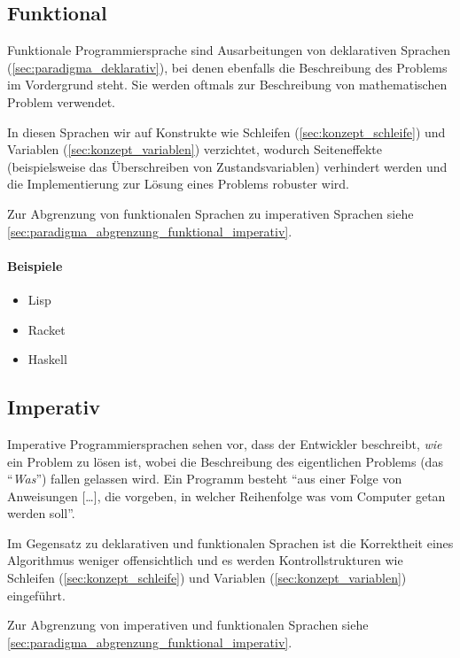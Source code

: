 	\subsection{Funktional}
		\label{sec:paradigma_funktional}
	
		Funktionale Programmiersprache sind Ausarbeitungen von deklarativen Sprachen (\ref{sec:paradigma_deklarativ}), bei denen ebenfalls die Beschreibung des Problems im Vordergrund steht. Sie werden oftmals zur Beschreibung von mathematischen Problem verwendet.
		
		In diesen Sprachen wir auf Konstrukte wie Schleifen (\ref{sec:konzept_schleife}) und Variablen (\ref{sec:konzept_variablen}) verzichtet, wodurch Seiteneffekte (beispielsweise das Überschreiben von Zustandsvariablen) verhindert werden und die Implementierung zur Lösung eines Problems robuster wird.
		
		Zur Abgrenzung von funktionalen Sprachen zu imperativen Sprachen siehe \ref{sec:paradigma_abgrenzung_funktional_imperativ}.
		
		\paragraph{Beispiele}
			\begin{itemize}
				\item Lisp
				\item Racket
				\item Haskell
			\end{itemize}
	
	\subsection{Imperativ}
		\label{sec:paradigma_imperativ}
	
		Imperative Programmiersprachen sehen vor, dass der Entwickler beschreibt, \textit{wie} ein Problem zu lösen ist, wobei die Beschreibung des eigentlichen Problems (das \enquote{\textit{Was}}) fallen gelassen wird. Ein Programm besteht \enquote{aus einer Folge von Anweisungen [\dots], die vorgeben, in welcher Reihenfolge was vom Computer getan werden soll}. ~\cite{andreas2005grundkurs}
		
		Im Gegensatz zu deklarativen und funktionalen Sprachen ist die Korrektheit eines Algorithmus weniger offensichtlich und es werden Kontrollstrukturen wie Schleifen (\ref{sec:konzept_schleife}) und Variablen (\ref{sec:konzept_variablen}) eingeführt.
		
		Zur Abgrenzung von imperativen und funktionalen Sprachen siehe \ref{sec:paradigma_abgrenzung_funktional_imperativ}.
		
